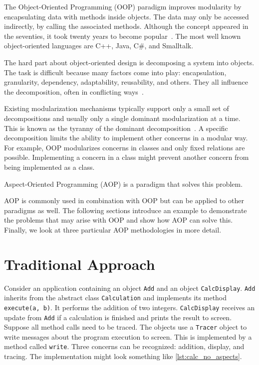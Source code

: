 The Object-Oriented Programming (OOP) paradigm improves modularity by encapsulating data with methods inside objects.
The data may only be accessed indirectly, by calling the associated methods.
Although the concept appeared in the seventies, it took twenty years to become popular~\cite{Watt90}.
The most well known object-oriented languages are C++, Java, C\#, and Smalltalk.

The hard part about object-oriented design is decomposing a system into objects.
The task is difficult because many factors come into play: encapsulation, granularity, dependency, adaptability, reusability, and others.
They all influence the decomposition, often in conflicting ways~\cite{Gamma95}.

Existing modularization mechanisms typically support only a small set of decompositions and usually only a single dominant modularization at a time.
This is known as the tyranny of the dominant decomposition~\cite{tarr:aosdbook05}.
A specific decomposition limits the ability to implement other concerns in a modular way.
For example, OOP modularizes concerns in classes and only fixed relations are possible.
Implementing a concern in a class might prevent another concern from being implemented as a class.

Aspect-Oriented Programming (AOP) is a paradigm that solves this problem.

AOP is commonly used in combination with OOP but can be applied to other paradigms as well.
The following sections introduce an example to demonstrate the problems that may arise with OOP and show how AOP can solve this.
Finally, we look at three particular AOP methodologies in more detail.

\section{Traditional Approach}
Consider an application containing an object \lstinline|Add| and an object \lstinline|CalcDisplay|.
\lstinline|Add| inherits from the abstract class \lstinline|Calculation| and implements its method \lstinline|execute(a, b)|. 
It performs the addition of two integers.
\lstinline|CalcDisplay| receives an update from \lstinline|Add| if a calculation is finished and prints the result to screen.
Suppose all method calls need to be traced.
The objects use a \lstinline|Tracer| object to write messages about the program execution to screen.
This is implemented by a method called \lstinline|write|.
Three concerns can be recognized: addition, display, and tracing.
The implementation might look something like \autoref{lst:calc_no_aspects}.

